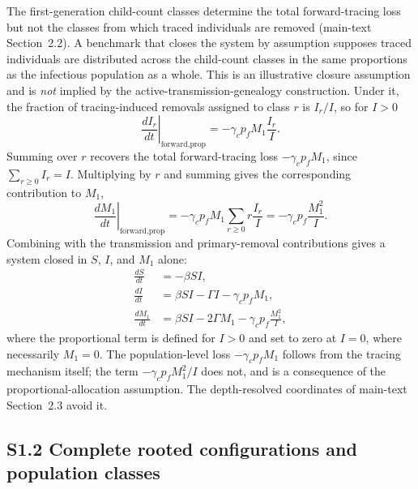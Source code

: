 \documentclass[11pt]{article}
\begin{document}
The first-generation child-count classes determine the total forward-tracing loss but not the classes from which traced individuals are removed (main-text Section~2.2). A benchmark that closes the system by assumption supposes traced individuals are distributed across the child-count classes in the same proportions as the infectious population as a whole. This is an illustrative closure assumption and is \emph{not} implied by the active-transmission-genealogy construction. Under it, the fraction of tracing-induced removals assigned to class $r$ is $I_r/I$, so for $I>0$
\begin{equation}
\left.\frac{dI_r}{dt}\right|_{\text{forward,prop}} = -\gamma_c p_f M_1 \frac{I_r}{I}.
\end{equation}
Summing over $r$ recovers the total forward-tracing loss $-\gamma_c p_f M_1$, since $\sum_{r\geq0}I_r=I$. Multiplying by $r$ and summing gives the corresponding contribution to $M_1$,
\begin{equation}
\left.\frac{dM_1}{dt}\right|_{\text{forward,prop}} = -\gamma_c p_f M_1 \sum_{r\geq0} r\frac{I_r}{I} = -\gamma_c p_f \frac{M_1^2}{I}.
\end{equation}
Combining with the transmission and primary-removal contributions gives a system closed in $S$, $I$, and $M_1$ alone:
\begin{align}
\frac{dS}{dt} &= -\beta S I, \\
\frac{dI}{dt} &= \beta S I - \Gamma I - \gamma_c p_f M_1, \\
\frac{dM_1}{dt} &= \beta S I - 2\Gamma M_1 - \gamma_c p_f \frac{M_1^2}{I},
\end{align}
where the proportional term is defined for $I>0$ and set to zero at $I=0$, where necessarily $M_1=0$. The population-level loss $-\gamma_c p_f M_1$ follows from the tracing mechanism itself; the term $-\gamma_c p_f M_1^2/I$ does not, and is a consequence of the proportional-allocation assumption. The depth-resolved coordinates of main-text Section~2.3 avoid it.

\subsection*{S1.2 Complete rooted configurations and population classes}
\end{document}
